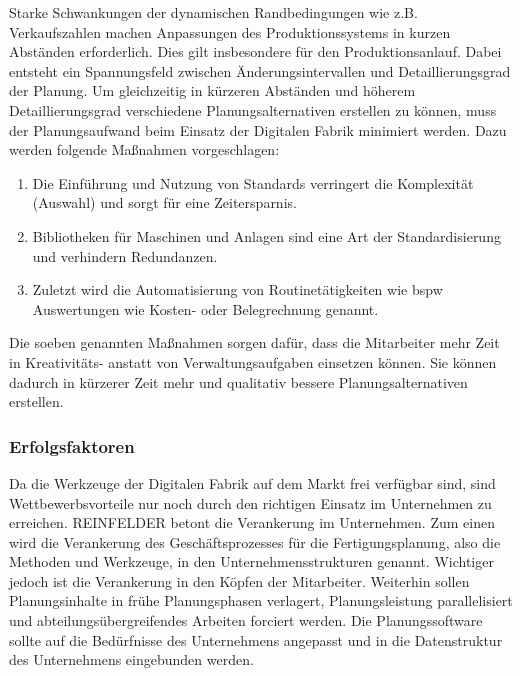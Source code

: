 Starke Schwankungen der dynamischen Randbedingungen wie z.B. Verkaufszahlen machen Anpassungen des Produktionssystems in kurzen Abständen erforderlich. Dies gilt insbesondere für den Produktionsanlauf. Dabei entsteht ein Spannungsfeld zwischen Änderungsintervallen und Detaillierungsgrad der Planung. Um gleichzeitig in kürzeren Abständen und höherem Detaillierungsgrad verschiedene Planungsalternativen erstellen zu können, muss der Planungsaufwand beim Einsatz der Digitalen Fabrik minimiert werden. 
Dazu werden folgende Maßnahmen vorgeschlagen: 
\begin{enumerate}
 \item Die Einführung und Nutzung von Standards verringert die Komplexität (Auswahl) und sorgt für eine Zeitersparnis.
 \item Bibliotheken für Maschinen und Anlagen sind eine Art der Standardisierung und verhindern Redundanzen.
 \item Zuletzt wird die Automatisierung von Routinetätigkeiten wie \gls{bspw} Auswertungen wie Kosten- oder Belegrechnung genannt. 
\end{enumerate}
%
% 
Die soeben genannten Maßnahmen sorgen dafür, dass die Mitarbeiter mehr Zeit in Kreativitäts- anstatt von Verwaltungsaufgaben einsetzen können. Sie können dadurch in kürzerer Zeit mehr und qualitativ bessere Planungsalternativen erstellen. 

\subsubsection{Erfolgsfaktoren}

Da die Werkzeuge der Digitalen Fabrik auf dem Markt frei verfügbar sind, sind Wettbewerbsvorteile nur noch durch den richtigen Einsatz im Unternehmen zu erreichen. 
REINFELDER betont die Verankerung im Unternehmen. Zum einen wird die Verankerung des Geschäftsprozesses für die Fertigungsplanung, also die Methoden und Werkzeuge, in den Unternehmensstrukturen genannt. Wichtiger jedoch ist die Verankerung in den Köpfen der Mitarbeiter. 
Weiterhin sollen Planungsinhalte in frühe Planungsphasen verlagert, Planungsleistung parallelisiert und abteilungsübergreifendes Arbeiten forciert werden. Die Planungssoftware sollte auf die Bedürfnisse des Unternehmens angepasst und in die Datenstruktur des Unternehmens eingebunden werden. 

% 
